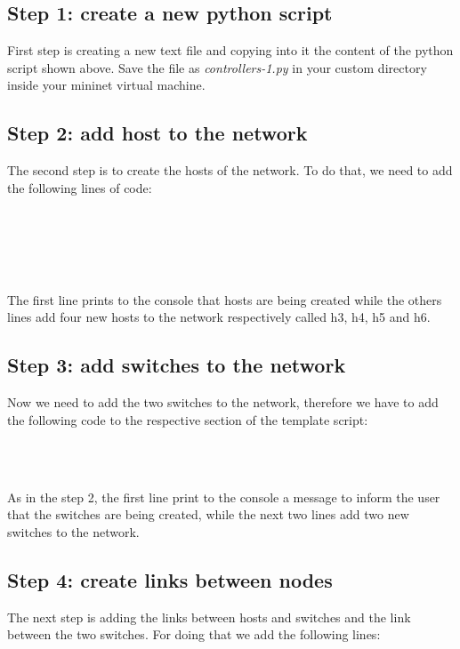 \subsection*{Step 1: create a new python script}
First step is creating a new text file and copying into it the content of the
python script shown above. Save the file as \emph{controllers-1.py} in your
custom directory inside your mininet virtual machine.


\subsection*{Step 2: add host to the network}
The second step is to create the hosts of the network. To do that, we need to add
the following lines of code:

  \\
  \\
  \\
  \\

The first line prints to the console that hosts are being created while the others
lines add four new hosts to the network respectively called h3, h4, h5 and h6.



\subsection*{Step 3: add switches to the network}
Now we need to add the two switches to the network, therefore we have to add the
following code to the respective section of the template script:

 \\
 \\

As in the step 2, the first line print to the console a message to inform the user
that the switches are being created, while the next two lines add two new switches
to the network.



\subsection*{Step 4: create links between nodes}
The next step is adding the links between hosts and switches and the link between the two
switches. For doing that we add the following lines:

